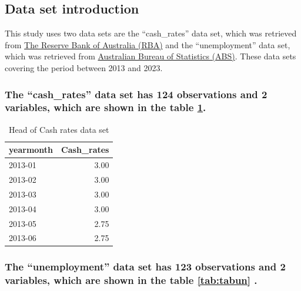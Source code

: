 \documentclass[11pt,a4paper,]{article}
\begin{document}
\hypertarget{data-set-introduction}{%
\subsection{Data set introduction}\label{data-set-introduction}}

This study uses two data sets are the ``cash\_rates'' data set, which was retrieved from \href{https://www.rba.gov.au/statistics/cash-rate/}{The Reserve Bank of Australia (RBA)}
and the ``unemployment'' data set, which was retrieved from \href{https://www.abs.gov.au/statistics/labour/employment-and-unemployment/labour-force-australia/latest-release}{Australian Bureau of Statistics (ABS)}. These data sets covering the period between 2013 and 2023.

\hypertarget{the-cash_rates-data-set-has-124-observations-and-2-variables-which-are-shown-in-the-table-reftabtabcash.}{%
\subsubsection{The ``cash\_rates'' data set has 124 observations and 2 variables, which are shown in the table \ref{tab:tabcash}.}\label{the-cash_rates-data-set-has-124-observations-and-2-variables-which-are-shown-in-the-table-reftabtabcash.}}

\begin{table}

\caption{\label{tab:tabcash}Head of Cash rates data set}
\centering
\begin{tabular}[t]{l|r}
\hline
yearmonth & Cash\_rates\\
\hline
2013-01 & 3.00\\
\hline
2013-02 & 3.00\\
\hline
2013-03 & 3.00\\
\hline
2013-04 & 3.00\\
\hline
2013-05 & 2.75\\
\hline
2013-06 & 2.75\\
\hline
\end{tabular}
\end{table}

\hypertarget{the-unemployment-data-set-has-123-observations-and-2-variables-which-are-shown-in-the-table-reftabtabun-.}{%
\subsubsection{The ``unemployment'' data set has 123 observations and 2 variables, which are shown in the table \ref{tab:tabun} .}\label{the-unemployment-data-set-has-123-observations-and-2-variables-which-are-shown-in-the-table-reftabtabun-.}}
\end{document}
